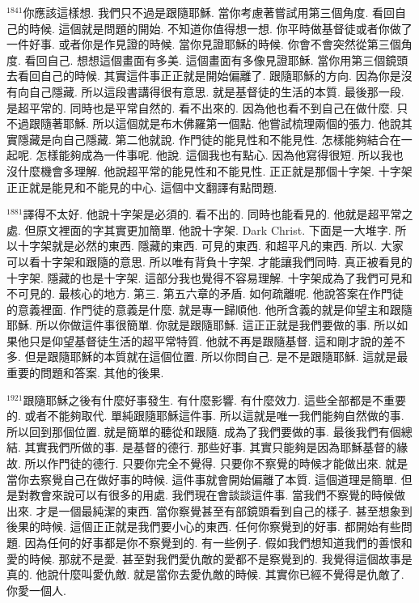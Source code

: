 \documentclass{book}
\begin{document}
$^{1841}$你應該這樣想.
我們只不過是跟隨耶穌.
當你考慮著嘗試用第三個角度.
看回自己的時候.
這個就是問題的開始.
不知道你值得想一想.
你平時做基督徒或者你做了一件好事.
或者你是作見證的時候.
當你見證耶穌的時候.
你會不會突然從第三個角度.
看回自己.
想想這個畫面有多美.
這個畫面有多像見證耶穌.
當你用第三個鏡頭去看回自己的時候.
其實這件事正正就是開始偏離了.
跟隨耶穌的方向.
因為你是沒有向自己隱藏.
所以這段書講得很有意思.
就是基督徒的生活的本質.
最後那一段.
是超平常的.
同時也是平常自然的.
看不出來的.
因為他也看不到自己在做什麼.
只不過跟隨著耶穌.
所以這個就是布木佛羅第一個點.
他嘗試梳理兩個的張力.
他說其實隱藏是向自己隱藏.
第二他就說.
作門徒的能見性和不能見性.
怎樣能夠結合在一起呢.
怎樣能夠成為一件事呢.
他說.
這個我也有點心.
因為他寫得很短.
所以我也沒什麼機會多理解.
他說超平常的能見性和不能見性.
正正就是那個十字架.
十字架正正就是能見和不能見的中心.
這個中文翻譯有點問題.

$^{1881}$譯得不太好.
他說十字架是必須的.
看不出的.
同時也能看見的.
他就是超平常之處.
但原文裡面的字其實更加簡單.
他說十字架.
Dark Christ.
下面是一大堆字.
所以十字架就是必然的東西.
隱藏的東西.
可見的東西.
和超平凡的東西.
所以.
大家可以看十字架和跟隨的意思.
所以唯有背負十字架.
才能讓我們同時.
真正被看見的十字架.
隱藏的也是十字架.
這部分我也覺得不容易理解.
十字架成為了我們可見和不可見的.
最核心的地方.
第三.
第五六章的矛盾.
如何疏離呢.
他說答案在作門徒的意義裡面.
作門徒的意義是什麼.
就是專一歸順他.
他所含義的就是仰望主和跟隨耶穌.
所以你做這件事很簡單.
你就是跟隨耶穌.
這正正就是我們要做的事.
所以如果他只是仰望基督徒生活的超平常特質.
他就不再是跟隨基督.
這和剛才說的差不多.
但是跟隨耶穌的本質就在這個位置.
所以你問自己.
是不是跟隨耶穌.
這就是最重要的問題和答案.
其他的後果.

$^{1921}$跟隨耶穌之後有什麼好事發生.
有什麼影響.
有什麼效力.
這些全部都是不重要的.
或者不能夠取代.
單純跟隨耶穌這件事.
所以這就是唯一我們能夠自然做的事.
所以回到那個位置.
就是簡單的聽從和跟隨.
成為了我們要做的事.
最後我們有個總結.
其實我們所做的事.
是基督的德行.
那些好事.
其實只能夠是因為耶穌基督的緣故.
所以作門徒的德行.
只要你完全不覺得.
只要你不察覺的時候才能做出來.
就是當你去察覺自己在做好事的時候.
這件事就會開始偏離了本質.
這個道理是簡單.
但是對教會來說可以有很多的用處.
我們現在會談談這件事.
當我們不察覺的時候做出來.
才是一個最純潔的東西.
當你察覺甚至有部鏡頭看到自己的樣子.
甚至想象到後果的時候.
這個正正就是我們要小心的東西.
任何你察覺到的好事.
都開始有些問題.
因為任何的好事都是你不察覺到的.
有一些例子.
假如我們想知道我們的善恨和愛的時候.
那就不是愛.
甚至對我們愛仇敵的愛都不是察覺到的.
我覺得這個故事是真的.
他說什麼叫愛仇敵.
就是當你去愛仇敵的時候.
其實你已經不覺得是仇敵了.
你愛一個人.
\end{document}
